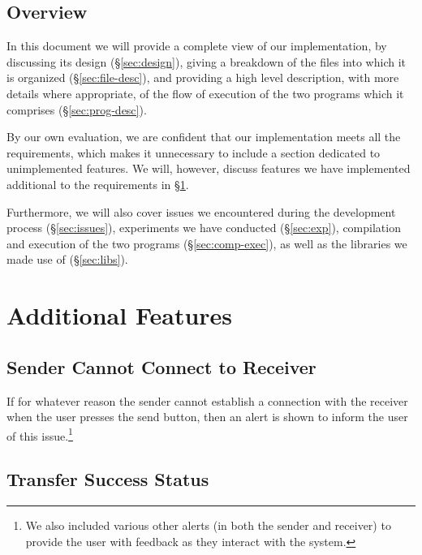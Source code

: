 \documentclass[10pt, a4paper]{article}
\begin{document}
\subsection{Overview}
\label{subsec:overview}

In this document we will provide a complete view of our implementation, by
discussing its design (\S\ref{sec:design}), giving a breakdown of the files into
which it is organized (\S\ref{sec:file-desc}), and providing a high level
description, with more details where appropriate, of the flow of execution of
the two programs which it comprises (\S\ref{sec:prog-desc}).

By our own evaluation, we are confident that our implementation meets all the
requirements, which makes it unnecessary to include a section dedicated to
unimplemented features. We will, however, discuss features we have implemented
additional to the requirements in \S\ref{sec:add-feat}.

Furthermore, we will also cover issues we encountered during the development
process (\S\ref{sec:issues}), experiments we have conducted (\S\ref{sec:exp}),
compilation and execution of the two programs (\S\ref{sec:comp-exec}), as well
as the libraries we made use of (\S\ref{sec:libs}).


\section{Additional Features}
\label{sec:add-feat}

\subsection{Sender Cannot Connect to Receiver}
\label{subsec:send-cant-connect}

If for whatever reason the sender cannot establish a connection with the
receiver when the user presses the send button, then an alert is shown to inform
the user of this issue.\footnote{We also included various other alerts (in both
the sender and receiver) to provide the user with feedback as they interact with
the system.}


\subsection{Transfer Success Status}
\label{subsec:trans-suc-stat}
\end{document}
